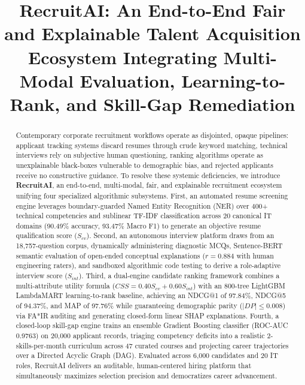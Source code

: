 \documentclass[conference]{IEEEtran}
\begin{document}
\title{RecruitAI: An End-to-End Fair and Explainable Talent Acquisition Ecosystem Integrating Multi-Modal Evaluation, Learning-to-Rank, and Skill-Gap Remediation}

\author{
}

\maketitle

\begin{abstract}
Contemporary corporate recruitment workflows operate as disjointed, opaque pipelines: applicant tracking systems discard resumes through crude keyword matching, technical interviews rely on subjective human questioning, ranking algorithms operate as unexplainable black-boxes vulnerable to demographic bias, and rejected applicants receive no constructive guidance. To resolve these systemic deficiencies, we introduce \textbf{RecruitAI}, an end-to-end, multi-modal, fair, and explainable recruitment ecosystem unifying four specialized algorithmic subsystems. First, an automated resume screening engine leverages boundary-guarded Named Entity Recognition (NER) over 400+ technical competencies and sublinear TF-IDF classification across 20 canonical IT domains (90.49\% accuracy, 93.47\% Macro F1) to generate an objective resume qualification score ($S_{cv}$). Second, an autonomous interview platform draws from an 18,757-question corpus, dynamically administering diagnostic MCQs, Sentence-BERT semantic evaluation of open-ended conceptual explanations ($r = 0.884$ with human engineering raters), and sandboxed algorithmic code testing to derive a role-adaptive interview score ($S_{int}$). Third, a dual-engine candidate ranking framework combines a multi-attribute utility formula ($CSS = 0.40S_{cv} + 0.60S_{int}$) with an 800-tree LightGBM LambdaMART learning-to-rank baseline, achieving an NDCG@1 of 97.84\%, NDCG@5 of 94.37\%, and MAP of 97.76\% while guaranteeing demographic parity ($|DP| \le 0.008$) via FA*IR auditing and generating closed-form linear SHAP explanations. Fourth, a closed-loop skill-gap engine trains an ensemble Gradient Boosting classifier (ROC-AUC 0.9763) on 20,000 applicant records, triaging competency deficits into a realistic 2-skills-per-month curriculum across 47 curated courses and projecting career trajectories over a Directed Acyclic Graph (DAG). Evaluated across 6,000 candidates and 20 IT roles, RecruitAI delivers an auditable, human-centered hiring platform that simultaneously maximizes selection precision and democratizes career advancement.
\end{abstract}
\end{document}
